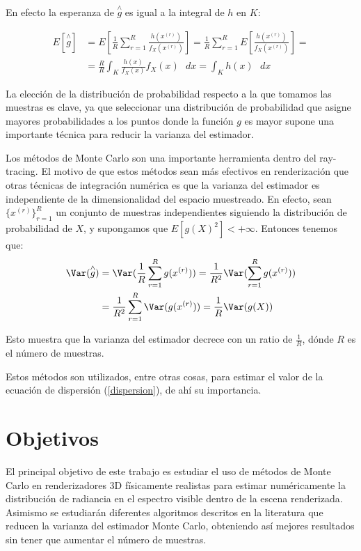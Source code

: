 En efecto la esperanza de $\overset{\wedge}{g}$ es igual a la integral de $h$ en $K$:

\begin{align*}
E[\overset{\wedge}{g}] &= E[\frac{1}{R}\sum_{r=1}^R \frac{h(x^{(r)})}{f_X(x^{(r)})}] = \frac{1}{R}\sum_{r=1}^R E[\frac{h(x^{(r)})}{f_X(x^{(r)})}] =\\
&= \frac{R}{R}  \int _K \frac{h(x)}{f_X(x)}f_X(x) \text{ }dx = \int _K h(x) \text{ }dx
\end{align*}

La elección de la distribución de probabilidad respecto a la que tomamos las muestras es clave, ya que seleccionar una distribución de probabilidad que asigne mayores probabilidades a los puntos donde la función $g$ es mayor supone una importante técnica para reducir la varianza del estimador.

Los métodos de Monte Carlo son una importante herramienta dentro del ray-tracing. El motivo de que estos métodos sean más efectivos en renderización que otras técnicas de integración numérica es que la varianza del estimador es independiente de la dimensionalidad del espacio muestreado. En efecto, sean $\{x^{(r)}\}_{r=1}^R$ un conjunto de muestras independientes siguiendo la distribución de probabilidad de $X$, y supongamos que $E[g(X)^2]< +\infty$. Entonces tenemos que:
\begin{align*}
\Var(\overset{\wedge}{g}) &= \Var(\frac{1}{R}\sum_{r=1}^R g(x^{(r)})) = \frac{1}{R^2}\Var(\sum_{r=1}^R g(x^{(r)})) \\
&= \frac{1}{R^2}\sum_{r=1}^R \Var(g(x^{(r)})) = \frac{1}{R} \Var(g(X))
\end{align*}

Esto muestra que la varianza del estimador decrece con un ratio de $\frac{1}{R}$, dónde $R$ es el número de muestras.

Estos métodos son utilizados, entre otras cosas, para estimar el valor de la ecuación de dispersión (\ref{dispersion}), de ahí su importancia.

\section{Objetivos}
El principal objetivo de este trabajo es estudiar el uso de métodos de Monte Carlo en renderizadores 3D físicamente realistas para estimar numéricamente la distribución de radiancia en el espectro visible dentro de la escena renderizada. Asimismo se estudiarán diferentes algoritmos descritos en la literatura que reducen la varianza del estimador Monte Carlo, obteniendo así mejores resultados sin tener que aumentar el número de muestras.



